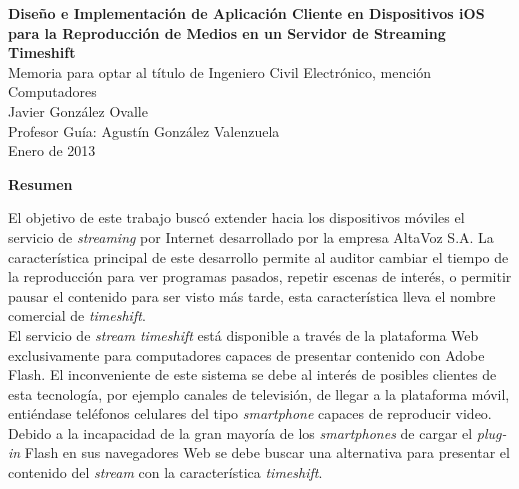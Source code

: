 \newpage
\thispagestyle{empty}
\begin{center}
 \Large \textbf{Diseño e Implementación de Aplicación Cliente en Dispositivos iOS para la Reproducción de Medios en un Servidor de Streaming Timeshift}\\

\normalsize Memoria para optar al título de Ingeniero Civil Electrónico, mención Computadores \\
\normalsize Javier González Ovalle \\
\normalsize Profesor Guía: Agustín González Valenzuela \\
\normalsize Enero de 2013 %

\Large \textbf{Resumen}

\end{center}
\normalsize


El objetivo de este trabajo buscó extender hacia los dispositivos móviles el servicio de \textit{streaming} por Internet desarrollado por la empresa AltaVoz S.A. La característica principal de este desarrollo permite al auditor cambiar el tiempo de la reproducción para ver programas pasados, repetir escenas de interés, o permitir pausar el contenido para ser visto más tarde, esta característica lleva el nombre comercial de \textit{timeshift}.\\


El servicio de \textit{stream timeshift} está disponible a través de la plataforma Web exclusivamente para computadores capaces de presentar contenido con Adobe Flash. El inconveniente de este sistema se debe al interés de posibles clientes de esta tecnología, por ejemplo canales de televisión, de llegar a la plataforma móvil, entiéndase teléfonos celulares del tipo \textit{smartphone} capaces de reproducir video. Debido a la incapacidad de la gran mayoría de los \textit{smartphones} de cargar el \textit{plug-in} Flash en sus navegadores Web se debe buscar una alternativa para presentar el contenido del \textit{stream} con la característica \textit{timeshift}.
\\


